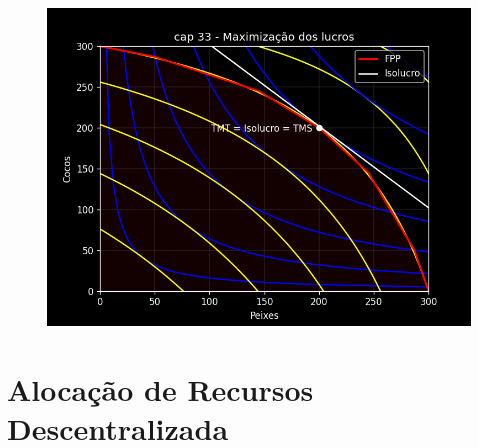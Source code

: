 \documentclass[a4paper,11pt,oneside]{book}
\theoremstyle{definition}
\theoremstyle{break}
\begin{document}
\begin{figure}[H]
	\centering
	\includegraphics[scale=0.6]{cap33_13-equilibrio_geral.png}
\end{figure}

\section{Alocação de Recursos Descentralizada}
\end{document}
